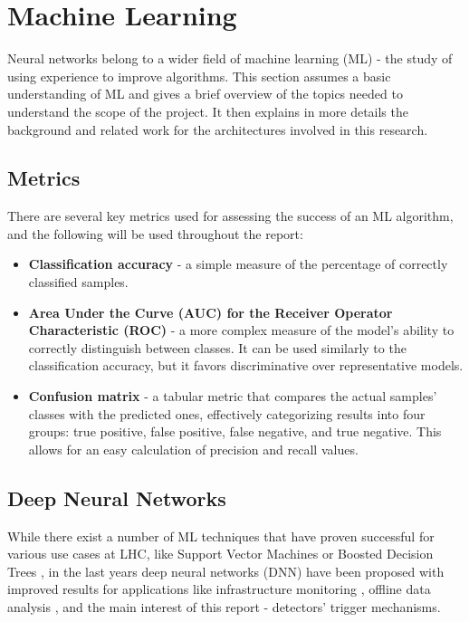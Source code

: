 \section{Machine Learning}
Neural networks belong to a wider field of machine learning (ML) - the study of using experience to improve algorithms. This section assumes a basic understanding of ML and gives a brief overview of the topics needed to understand the scope of the project. It then explains in more details the background and related work for the architectures involved in this research.


\subsection{Metrics} \label{ml-accuracy-auc-confusion}
There are several key metrics used for assessing the success of an ML algorithm, and the following will be used throughout the report:

\begin{itemize}
  \item \textbf{Classification accuracy} - a simple measure of the percentage of correctly classified samples.
  \item \textbf{Area Under the Curve (AUC) for the Receiver Operator Characteristic (ROC)} - a more complex measure of the model's ability to correctly distinguish between classes. It can be used similarly to the classification accuracy, but it favors discriminative over representative models.
  \item \textbf{Confusion matrix} - a tabular metric that compares the actual samples' classes with the predicted ones, effectively categorizing results into four groups: true positive, false positive, false negative, and true negative. This allows for an easy calculation of precision and recall values.
\end{itemize}



\subsection{Deep Neural Networks}
While there exist a number of ML techniques that have proven successful for various use cases at LHC, like Support Vector Machines \cite{38-valentino2012classification} or Boosted Decision Trees \cite{pmlr-v42-chen14}, in the last years deep neural networks (DNN) have been proposed with improved results for applications like infrastructure monitoring \cite{39-skoczen2016lstm}, offline data analysis \cite{40-ren2020unveiling}, and the main interest of this report - detectors' trigger mechanisms.


